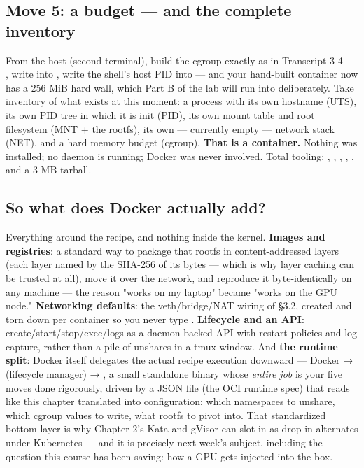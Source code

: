\subsection*{Move 5: a budget — and the complete inventory}

From the host (second terminal), build the cgroup exactly as in Transcript 3-4 — , write  into , write the shell's host PID into  — and your hand-built container now has a 256 MiB hard wall, which Part B of the lab will run into deliberately. Take inventory of what exists at this moment: a process with its own hostname (UTS), its own PID tree in which it is init (PID), its own mount table and root filesystem (MNT + the rootfs), its own — currently empty — network stack (NET), and a hard memory budget (cgroup). \textbf{That is a container.} Nothing was installed; no daemon is running; Docker was never involved. Total tooling: , , , , , and a 3 MB tarball.

\subsection*{So what does Docker actually add?}

Everything around the recipe, and nothing inside the kernel. \textbf{Images and registries}: a standard way to package that rootfs in content-addressed layers (each layer named by the SHA-256 of its bytes — which is why layer caching can be trusted at all), move it over the network, and reproduce it byte-identically on any machine — the reason "works on my laptop" became "works on the GPU node." \textbf{Networking defaults}: the veth/bridge/NAT wiring of §3.2, created and torn down per container so you never type . \textbf{Lifecycle and an API}: create/start/stop/exec/logs as a daemon-backed API with restart policies and log capture, rather than a pile of unshares in a tmux window. And \textbf{the runtime split}: Docker itself delegates the actual recipe execution downward — Docker →  (lifecycle manager) → , a small standalone binary whose \textit{entire job} is your five moves done rigorously, driven by a JSON file (the OCI runtime spec) that reads like this chapter translated into configuration: which namespaces to unshare, which cgroup values to write, what rootfs to pivot into. That standardized bottom layer is why Chapter 2's Kata and gVisor can slot in as drop-in alternates under Kubernetes — and it is precisely next week's subject, including the question this course has been saving: how a GPU gets injected into the box.

